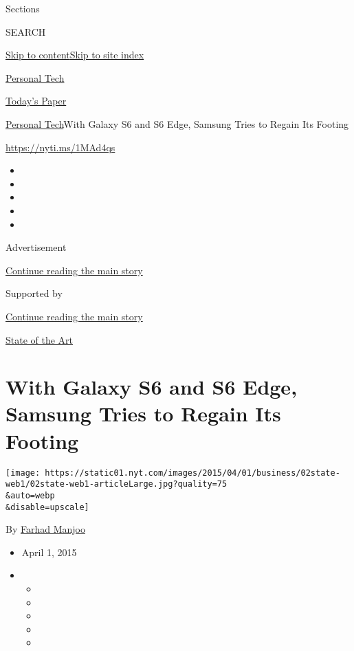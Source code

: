 Sections

SEARCH

\protect\hyperlink{site-content}{Skip to
content}\protect\hyperlink{site-index}{Skip to site index}

\href{https://www.nytimes.com/section/technology/personaltech}{Personal
Tech}

\href{https://myaccount.nytimes.com/auth/login?response_type=cookie\&client_id=vi}{}

\href{https://www.nytimes.com/section/todayspaper}{Today's Paper}

\href{/section/technology/personaltech}{Personal Tech}\textbar{}With
Galaxy S6 and S6 Edge, Samsung Tries to Regain Its Footing

\url{https://nyti.ms/1MAd4qs}

\begin{itemize}
\item
\item
\item
\item
\item
\end{itemize}

Advertisement

\protect\hyperlink{after-top}{Continue reading the main story}

Supported by

\protect\hyperlink{after-sponsor}{Continue reading the main story}

\href{/column/state-of-the-art}{State of the Art}

\hypertarget{with-galaxy-s6-and-s6-edge-samsung-tries-to-regain-its-footing}{%
\section{With Galaxy S6 and S6 Edge, Samsung Tries to Regain Its
Footing}\label{with-galaxy-s6-and-s6-edge-samsung-tries-to-regain-its-footing}}

\texttt{[image: https://static01.nyt.com/images/2015/04/01/business/02state-web1/02state-web1-articleLarge.jpg?quality=75\\\&auto=webp\\\&disable=upscale]}

By \href{http://www.nytimes.com/by/farhad-manjoo}{Farhad Manjoo}

\begin{itemize}
\item
  April 1, 2015
\item
  \begin{itemize}
  \item
  \item
  \item
  \item
  \item
  \end{itemize}
\end{itemize}

